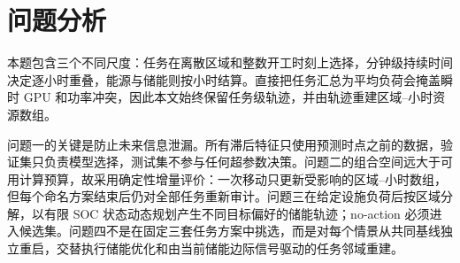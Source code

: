 \section{问题分析}
本题包含三个不同尺度：任务在离散区域和整数开工时刻上选择，分钟级持续时间决定逐小时重叠，能源与储能则按小时结算。直接把任务汇总为平均负荷会掩盖瞬时 GPU 和功率冲突，因此本文始终保留任务级轨迹，并由轨迹重建区域--小时资源数组。

问题一的关键是防止未来信息泄漏。所有滞后特征只使用预测时点之前的数据，验证集只负责模型选择，测试集不参与任何超参数决策。问题二的组合空间远大于可用计算预算，故采用确定性增量评价：一次移动只更新受影响的区域--小时数组，但每个命名方案结束后仍对全部任务重新审计。问题三在给定设施负荷后按区域分解，以有限 SOC 状态动态规划产生不同目标偏好的储能轨迹；no-action 必须进入候选集。问题四不是在固定三套任务方案中挑选，而是对每个情景从共同基线独立重启，交替执行储能优化和由当前储能边际信号驱动的任务邻域重建。
